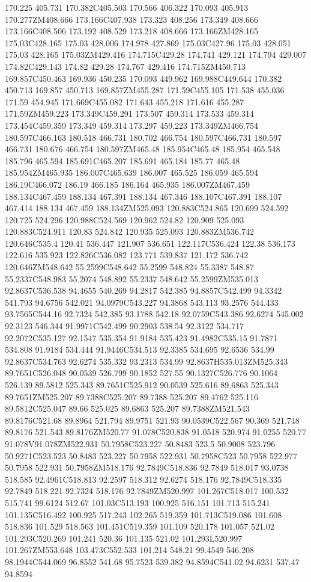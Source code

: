 170.225 405.731 170.382C405.503 170.566 406.322 170.093 405.913 170.277ZM408.666 173.166C407.938 173.323 408.256 173.349 408.666 173.166C408.506 173.192 408.529 173.218 408.666 173.166ZM428.165 175.03C428.165 175.03 428.006 174.978 427.869 175.03C427.96 175.03 428.051 175.03 428.165 175.03ZM429.416 174.715C429.28 174.741 429.121 174.794 429.007 174.82C429.143 174.82 429.28 174.767 429.416 174.715ZM450.713 169.857C450.463 169.936 450.235 170.093 449.962 169.988C449.644 170.382 450.713 169.857 450.713 169.857ZM455.287 171.59C455.105 171.538 455.036 171.59 454.945 171.669C455.082 171.643 455.218 171.616 455.287 171.59ZM459.223 173.349C459.291 173.507 459.314 173.533 459.314 173.454C459.359 173.349 459.314 173.297 459.223 173.349ZM466.754 180.597C466.163 180.518 466.731 180.702 466.754 180.597C466.731 180.597 466.731 180.676 466.754 180.597ZM465.48 185.954C465.48 185.954 465.548 185.796 465.594 185.691C465.207 185.691 465.184 185.77 465.48 185.954ZM465.935 186.007C465.639 186.007 465.525 186.059 465.594 186.19C466.072 186.19 466.185 186.164 465.935 186.007ZM467.459 188.134C467.459 188.134 467.391 188.134 467.346 188.107C467.391 188.107 467.414 188.134 467.459 188.134ZM525.093 120.883C524.865 120.699 524.592 120.725 524.296 120.988C524.569 120.962 524.82 120.909 525.093 120.883C524.911 120.83 524.842 120.935 525.093 120.883ZM536.742 120.646C535.4 120.41 536.447 121.907 536.651 122.117C536.424 122.38 536.173 122.616 535.923 122.826C536.082 123.771 539.837 121.172 536.742 120.646ZM548.642 55.2599C548.642 55.2599 548.824 55.3387 548.87 55.2337C548.983 55.2074 548.892 55.2337 548.642 55.2599ZM535.013 92.8637C536.538 94.4655 540.269 94.2817 542.385 94.8857C542.499 94.3342 541.793 94.6756 542.021 94.0979C543.227 94.3868 543.113 93.2576 544.433 93.7565C544.16 92.7324 542.385 93.1788 542.18 92.0759C543.386 92.6274 545.002 92.3123 546.344 91.9971C542.499 90.2903 538.54 92.3122 534.717 92.2072C535.127 92.1547 535.354 91.9184 535.423 91.4982C535.15 91.7871 534.808 91.9184 534.444 91.9446C534.513 92.3385 534.695 92.6536 534.99 92.8637C534.763 92.6274 535.332 93.2313 534.99 92.8637H535.013ZM525.343 89.7651C526.048 90.0539 526.799 90.1852 527.55 90.1327C526.776 90.1064 526.139 89.5812 525.343 89.7651C525.912 90.0539 525.616 89.6863 525.343 89.7651ZM525.207 89.7388C525.207 89.7388 525.207 89.4762 525.116 89.5812C525.047 89.66 525.025 89.6863 525.207 89.7388ZM521.543 89.8176C521.68 89.8964 521.794 89.9751 521.93 90.0539C522.567 90.369 521.748 89.8176 521.543 89.8176ZM520.77 91.078C520.838 91.0518 520.974 91.0255 520.77 91.078V91.078ZM522.931 50.7958C523.227 50.8483 523.5 50.9008 523.796 50.9271C523.523 50.8483 523.227 50.7958 522.931 50.7958C523 50.7958 522.977 50.7958 522.931 50.7958ZM518.176 92.7849C518.836 92.7849 518.017 93.0738 518.585 92.4961C518.813 92.2597 518.312 92.6274 518.176 92.7849C518.335 92.7849 518.221 92.7324 518.176 92.7849ZM520.997 101.267C518.017 100.532 515.741 99.6124 512.67 101.03C513.193 100.925 516.151 101.713 515.241 101.135C516.492 100.925 517.243 102.265 519.359 101.713C519.086 101.608 518.836 101.529 518.563 101.451C519.359 101.109 520.178 101.057 521.02 101.293C520.269 101.241 520.36 101.135 521.02 101.293L520.997 101.267ZM553.648 103.473C552.533 101.214 548.21 99.4549 546.208 98.1944C544.069 96.8552 541.68 95.7523 539.382 94.8594C541.02 94.6231 537.47 94.8594 